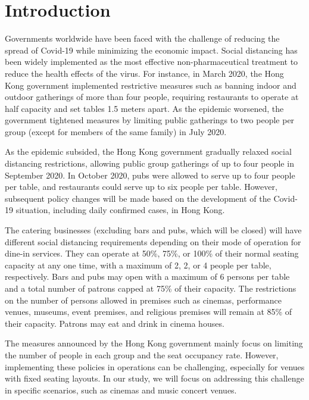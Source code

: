 \section{Introduction}

Governments worldwide have been faced with the challenge of reducing the spread of Covid-19 while minimizing the economic impact. Social distancing has been widely implemented as the most effective non-pharmaceutical treatment to reduce the health effects of the virus. For instance, in March 2020, the Hong Kong government implemented restrictive measures such as banning indoor and outdoor gatherings of more than four people, requiring restaurants to operate at half capacity and set tables 1.5 meters apart. As the epidemic worsened, the government tightened measures by limiting public gatherings to two people per group (except for members of the same family) in July 2020.

As the epidemic subsided, the Hong Kong government gradually relaxed social distancing restrictions, allowing public group gatherings of up to four people in September 2020. In October 2020, pubs were allowed to serve up to four people per table, and restaurants could serve up to six people per table. However, subsequent policy changes will be made based on the development of the Covid-19 situation, including daily confirmed cases, in Hong Kong.


The catering businesses (excluding bars and pubs, which will be closed) will have different social distancing requirements depending on their mode of operation for dine-in services. They can operate at 50\%, 75\%, or 100\% of their normal seating capacity at any one time, with a maximum of 2, 2, or 4 people per table, respectively. Bars and pubs may open with a maximum of 6 persons per table and a total number of patrons capped at 75\% of their capacity. The restrictions on the number of persons allowed in premises such as cinemas, performance venues, museums, event premises, and religious premises will remain at 85\% of their capacity. Patrons may eat and drink in cinema houses. 

The measures announced by the Hong Kong government mainly focus on limiting the number of people in each group and the seat occupancy rate. However, implementing these policies in operations can be challenging, especially for venues with fixed seating layouts. In our study, we will focus on addressing this challenge in specific scenarios, such as cinemas and music concert venues. 

